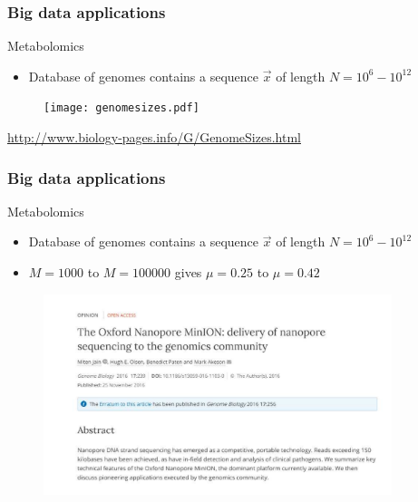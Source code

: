 \documentclass[10pt,xcolor=table]{beamer}
\begin{document}
\begin{frame}\frametitle{Big data applications}
\begin{block}{Metabolomics}
\begin{itemize}
  \item Database of genomes contains a sequence $\vec{x}$ of length $N=10^{6}-10^{12}$
\end{itemize}

\end{block}
  \begin{figure}[h]
  \texttt{[image: genomesizes.pdf]}
  \end{figure}

\url{http://www.biology-pages.info/G/GenomeSizes.html}
\end{frame}
\begin{frame}\frametitle{Big data applications}
\begin{block}{Metabolomics}
\begin{itemize}
  \item Database of genomes contains a sequence $\vec{x}$ of length $N=10^{6}-10^{12}$
  \item $M=1000$ to $M = 100000$ gives $\mu = 0.25$ to $\mu = 0.42$
\end{itemize}

  \begin{figure}[h]
  \includegraphics[width=4.0in]{genomebiology.pdf}
  \end{figure}


\end{block}

\end{frame}
\end{document}
